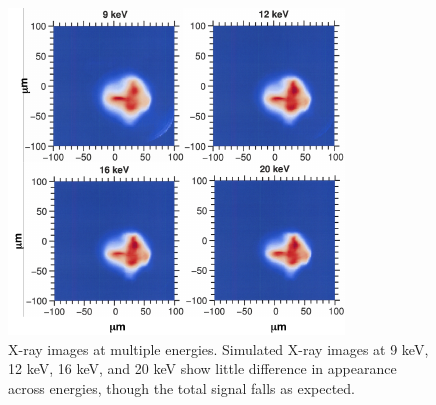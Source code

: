 \documentclass[aip,pop,numerical,reprint,floatfix]{revtex4-1}
\begin{document}
\begin{figure}[htb]
\begin{centering}
\includegraphics[width=0.8\columnwidth]{multi-energy_xray}
\par\end{centering}
\caption{\label{fig:multi-energy_xray}X-ray images at multiple energies. Simulated X-ray images at 9 keV, 12 keV, 16 keV, and 20 keV show little difference in appearance across energies, though the total signal falls as expected.}
\end{figure}
\end{document}

